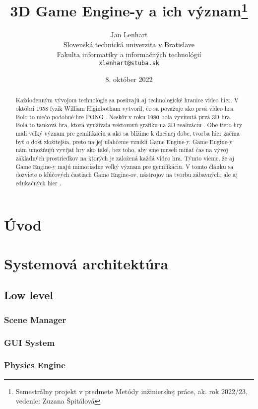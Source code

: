 \documentclass[10pt,twoside,slovak,a4paper,hidelinks]{article}
\title{3D Game Engine-y a ich význam\thanks{Semestrálny projekt v predmete Metódy inžinierskej práce, ak. rok 2022/23, vedenie: Zuzana Špitálová}} %
\author{Jan Lenhart\\[2pt]
	{\small Slovenská technická univerzita v Bratislave}\\
	{\small Fakulta informatiky a informačných technológií}\\
	{\small \texttt{xlenhart@stuba.sk}}
}
\date{\small 8. október 2022} %
\begin{document}
\maketitle

\begin{abstract}
Každodenným vývojom technológie sa posúvajú aj technologické hranice video hier. V októbri 1958 fyzik William Higinbotham vytvoril, čo sa považuje ako prvá video hra. Bolo to niečo podobné hre PONG \cite{FirstGame}. Neskôr v roku 1980 bola vyvinutá prvá 3D hra. Bola to tanková hra, ktorá využívala vektorovú grafiku na 3D realizáciu \cite{First3DGame}. Obe tieto hry mali veľký význam pre gemifikáciu a ako sa blížime k dnešnej dobe, tvorba hier začína byť o dosť zložitejšia, preto na jej uľahčenie vznikli Game Engine-y. Game Engine-y nám umožňujú vyvíjať hry ako také, bez toho, aby sme museli míňať čas na vývoj základných prostriedkov na ktorých je založená každá video hra. Týmto vieme, že aj Game Engine-y majú mimoriadne veľký význam pre gemifikáciu. V tomto článku sa dozviete o kľúčových častiach Game Engine-ov, nástrojov na tvorbu zábavných, ale aj edukačných hier \cite{IEEE}.
\end{abstract}


\section{Úvod}
\section{Systemová architektúra}
\subsection{Low level}
\subsubsection{Scene Manager}
\subsubsection{GUI System}
\subsubsection{Physics Engine}
\end{document}
